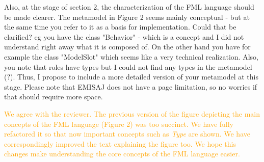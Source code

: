 \documentclass[10pt]{article}
\begin{document}
\begin{response}
%
%
%
%
%
%
%
%
%

\end{response}

\begin{response}{Also, at the stage of section 2, the characterization of the FML language should be made clearer. The metamodel in Figure 2 seems mainly conceptual - but at the same time you refer to it as a basis for implementation. Could that be clarified? eg you have the class "Behavior" - which is a concept and I did not understand right away what it is composed of. On the other hand you have for example the class "ModelSlot" which seems like a very technical realization. Also, you note that roles have types but I could not find any types in the metamodel (?). Thus, I propose to include a more detailed version of your metamodel at this stage. Please note that EMISAJ does not have a page limitation, so no worries if that should require more space.} 

\textcolor{orange}{We agree with the reviewer. The previous version of the figure depicting the main concepts of the FML language (Figure 2) was too succinct. We have fully refactored it so that now important concepts such as \emph{Type} are shown. We have correspondingly improved the text explaining the figure too. We hope this changes make understanding the core concepts of the FML language easier.}

\end{response}
\end{document}
